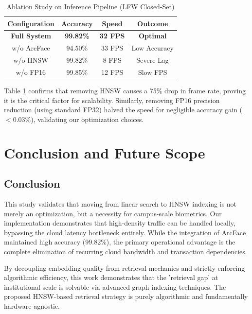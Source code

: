 \documentclass[conference]{IEEEtran}
\begin{document}
\begin{table}[htbp]
\caption{Ablation Study on Inference Pipeline (LFW Closed-Set)}
\begin{center}
\begin{tabular}{|c|c|c|c|}
\hline
\textbf{Configuration} & \textbf{Accuracy} & \textbf{Speed} & \textbf{Outcome} \\
\hline
\textbf{Full System} & \textbf{99.82\%} & \textbf{32 FPS} & \textbf{Optimal} \\
\hline
w/o ArcFace & 94.50\% & 33 FPS & Low Accuracy \\
\hline
w/o HNSW & 99.82\% & 8 FPS & Severe Lag \\
\hline
w/o FP16 & 99.85\% & 12 FPS & Slow FPS \\
\hline
\end{tabular}
\label{tab_ablation}
\end{center}
\end{table}

Table \ref{tab_ablation} confirms that removing HNSW causes a 75\% drop in frame rate, proving it is the critical factor for scalability. Similarly, removing FP16 precision reduction (using standard FP32) halved the speed for negligible accuracy gain ($<0.03\%$), validating our optimization choices.

\section{Conclusion and Future Scope}

\subsection{Conclusion}
This study validates that moving from linear search to HNSW indexing is not merely an optimization, but a necessity for campus-scale biometrics. Our implementation demonstrates that high-density traffic can be handled locally, bypassing the cloud latency bottleneck entirely. While the integration of ArcFace maintained high accuracy (99.82\%), the primary operational advantage is the complete elimination of recurring cloud bandwidth and transaction dependencies. 

By decoupling embedding quality from retrieval mechanics and strictly enforcing algorithmic efficiency, this work demonstrates that the 'retrieval gap' at institutional scale is solvable via advanced graph indexing techniques. The proposed HNSW-based retrieval strategy is purely algorithmic and fundamentally hardware-agnostic. 
\end{document}
